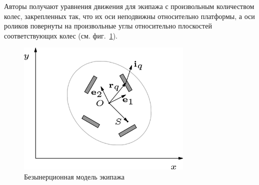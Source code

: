 Авторы \cite{Borisov2011} получают уравнения движения для экипажа с произвольным количеством колес, закрепленных так, что их оси неподвижны относительно платформы, а оси роликов повернуты на произвольные углы относительно плоскостей соответствующих колес (см. фиг.~\ref{fig:bor_vehicle}).

\begin{figure}[ht!]
    \centering
    \includegraphics[width=0.75\textwidth]{content/pic/asy/cart_bor.png}
    \caption{Безынерционная модель экипажа}
    \label{fig:bor_vehicle}
\end{figure}

